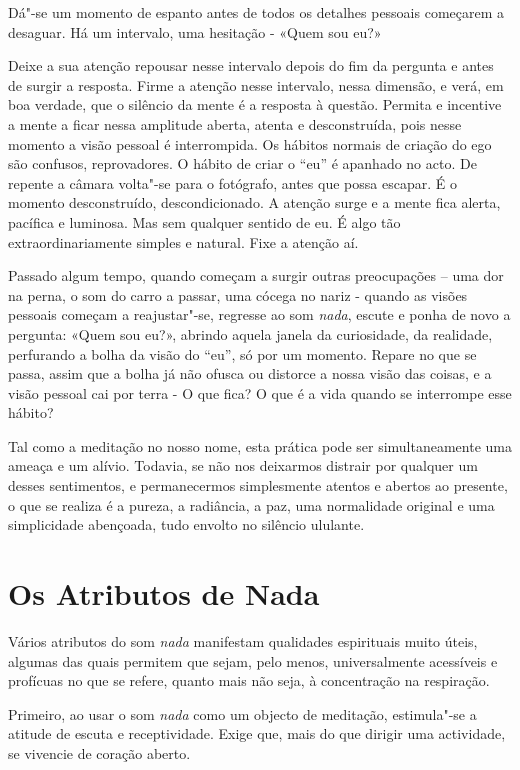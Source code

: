 Dá"-se um momento de espanto antes de todos os detalhes pessoais
começarem a desaguar. Há um intervalo, uma hesitação - «Quem sou eu?»

Deixe a sua atenção repousar nesse intervalo depois do fim da pergunta e
antes de surgir a resposta. Firme a atenção nesse intervalo, nessa
dimensão, e verá, em boa verdade, que o silêncio da mente é a resposta à
questão. Permita e incentive a mente a ficar nessa amplitude aberta,
atenta e desconstruída, pois nesse momento a visão pessoal é
interrompida. Os hábitos normais de criação do ego são confusos,
reprovadores. O hábito de criar o ``eu'' é apanhado no acto. De repente
a câmara volta"-se para o fotógrafo, antes que possa escapar. É o momento
desconstruído, descondicionado. A atenção surge e a mente fica alerta,
pacífica e luminosa. Mas sem qualquer sentido de eu. É algo tão
extraordinariamente simples e natural. Fixe a atenção aí.

Passado algum tempo, quando começam a surgir outras preocupações -- uma
dor na perna, o som do carro a passar, uma cócega no nariz - quando as
visões pessoais começam a reajustar"-se, regresse ao som \emph{nada},
escute e ponha de novo a pergunta: «Quem sou eu?», abrindo aquela janela
da curiosidade, da realidade, perfurando a bolha da visão do ``eu'', só
por um momento. Repare no que se passa, assim que a bolha já não ofusca
ou distorce a nossa visão das coisas, e a visão pessoal cai por terra -
O que fica? O que é a vida quando se interrompe esse hábito?

Tal como a meditação no nosso nome, esta prática pode ser
simultaneamente uma ameaça e um alívio. Todavia, se não nos deixarmos
distrair por qualquer um desses sentimentos, e permanecermos
simplesmente atentos e abertos ao presente, o que se realiza é a pureza,
a radiância, a paz, uma normalidade original e uma simplicidade
abençoada, tudo envolto no silêncio ululante.

\section{Os Atributos de Nada}

Vários atributos do som \emph{nada} manifestam qualidades espirituais
muito úteis, algumas das quais permitem que sejam, pelo menos,
universalmente acessíveis e profícuas no que se refere, quanto mais não
seja, à concentração na respiração.

Primeiro, ao usar o som \emph{nada} como um objecto de meditação,
estimula"-se a atitude de escuta e receptividade. Exige que, mais do que
dirigir uma actividade, se vivencie de coração aberto.

